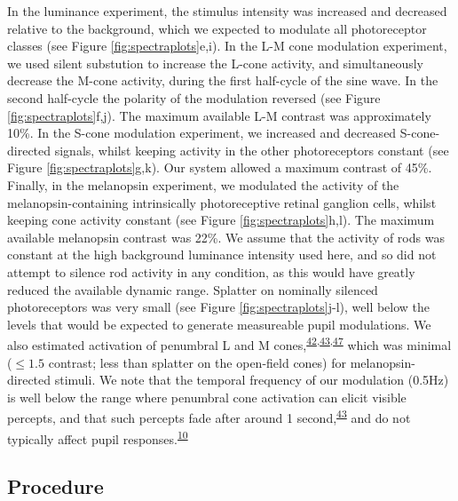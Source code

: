 \documentclass[
]{article}
\begin{document}
In the luminance experiment, the stimulus intensity was increased and decreased relative to the background, which we expected to modulate all photoreceptor classes (see Figure \ref{fig:spectraplots}e,i). In the L-M cone modulation experiment, we used silent substution to increase the L-cone activity, and simultaneously decrease the M-cone activity, during the first half-cycle of the sine wave. In the second half-cycle the polarity of the modulation reversed (see Figure \ref{fig:spectraplots}f,j). The maximum available L-M contrast was approximately 10\%. In the S-cone modulation experiment, we increased and decreased S-cone-directed signals, whilst keeping activity in the other photoreceptors constant (see Figure \ref{fig:spectraplots}g,k). Our system allowed a maximum contrast of 45\%. Finally, in the melanopsin experiment, we modulated the activity of the melanopsin-containing intrinsically photoreceptive retinal ganglion cells, whilst keeping cone activity constant (see Figure \ref{fig:spectraplots}h,l). The maximum available melanopsin contrast was 22\%. We assume that the activity of rods was constant at the high background luminance intensity used here, and so did not attempt to silence rod activity in any condition, as this would have greatly reduced the available dynamic range. Splatter on nominally silenced photoreceptors was very small (see Figure \ref{fig:spectraplots}j-l), well below the levels that would be expected to generate measureable pupil modulations. We also estimated activation of penumbral L and M cones,\textsuperscript{\protect\hyperlink{ref-Barrionuevo2016}{42},\protect\hyperlink{ref-Spitschan2015}{43},\protect\hyperlink{ref-Zele2019}{47}} which was minimal (\(\le 1.5%
\) contrast; less than splatter on the open-field cones) for melanopsin-directed stimuli. We note that the temporal frequency of our modulation (0.5Hz) is well below the range where penumbral cone activation can elicit visible percepts, and that such percepts fade after around 1 second,\textsuperscript{\protect\hyperlink{ref-Spitschan2015}{43}} and do not typically affect pupil responses.\textsuperscript{\protect\hyperlink{ref-Spitschan2014}{10}}

\hypertarget{procedure}{%
\subsection{Procedure}\label{procedure}}
\end{document}
